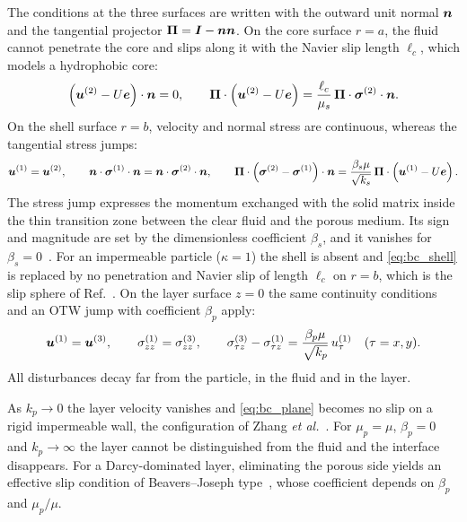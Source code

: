The conditions at the three surfaces are written with the outward unit normal $\bm{n}$ and the tangential projector
$\bm\Pi=\bm{I}-\bm{n}\bm{n}$. On the core surface $r=a$, the fluid cannot penetrate the core and slips along it with the Navier
slip length $\ell_c$, which models a hydrophobic core:
\begin{equation}
  \left(\bm{u}^{(2)}-U\bm{e}\right)\cdot\bm{n}=0,\qquad
  \bm\Pi\cdot\left(\bm{u}^{(2)}-U\bm{e}\right)=\frac{\ell_c}{\mu_s}\,\bm\Pi\cdot\bm{\sigma}^{(2)}\cdot\bm{n} .
  \label{eq:bc_core}
\end{equation}
On the shell surface $r=b$, velocity and normal stress are continuous, whereas the tangential stress jumps:
\begin{equation}
  \bm{u}^{(1)}=\bm{u}^{(2)},\qquad \bm{n}\cdot\bm{\sigma}^{(1)}\cdot\bm{n}=\bm{n}\cdot\bm{\sigma}^{(2)}\cdot\bm{n},\qquad
  \bm\Pi\cdot\left(\bm{\sigma}^{(2)}-\bm{\sigma}^{(1)}\right)\cdot\bm{n}=\frac{\beta_s\mu}{\sqrt{k_s}}\,\bm\Pi\cdot\left(\bm{u}^{(1)}-U\bm{e}\right).
  \label{eq:bc_shell}
\end{equation}
The stress jump expresses the momentum exchanged with the solid matrix inside the thin transition zone between the
clear fluid and the porous medium. Its sign and magnitude are set by the dimensionless coefficient $\beta_s$, and it
vanishes for $\beta_s=0$~\cite{ochoatapia1995momentum}. For an impermeable particle ($\kappa=1$) the shell is absent and
\cref{eq:bc_shell} is replaced by no penetration and Navier slip of length $\ell_c$ on $r=b$, which is the slip sphere of
Ref.~. On the layer surface $z=0$ the same continuity conditions and an OTW jump with
coefficient $\beta_p$ apply:
\begin{equation}
  \bm{u}^{(1)}=\bm{u}^{(3)},\qquad \sigma^{(1)}_{zz}=\sigma^{(3)}_{zz},\qquad
  \sigma^{(3)}_{\tau z}-\sigma^{(1)}_{\tau z}=\frac{\beta_p\mu}{\sqrt{k_p}}\,u^{(1)}_\tau\quad(\tau=x,y).
  \label{eq:bc_plane}
\end{equation}
All disturbances decay far from the particle, in the fluid and in the layer.

\begin{remark}\label{rem:bj}
As $k_p\to0$ the layer velocity vanishes and \cref{eq:bc_plane} becomes no slip on a rigid impermeable wall, the
configuration of Zhang \emph{et al.}~\cite{zhang2023unsteady}. For $\mu_p=\mu$, $\beta_p=0$ and $k_p\to\infty$ the layer
cannot be distinguished from the fluid and the interface disappears. For a Darcy-dominated layer, eliminating the porous
side yields an effective slip condition of Beavers--Joseph type~\cite{beavers1967boundary}, whose coefficient depends on
$\beta_p$ and $\mu_p/\mu$. 
\end{remark}

